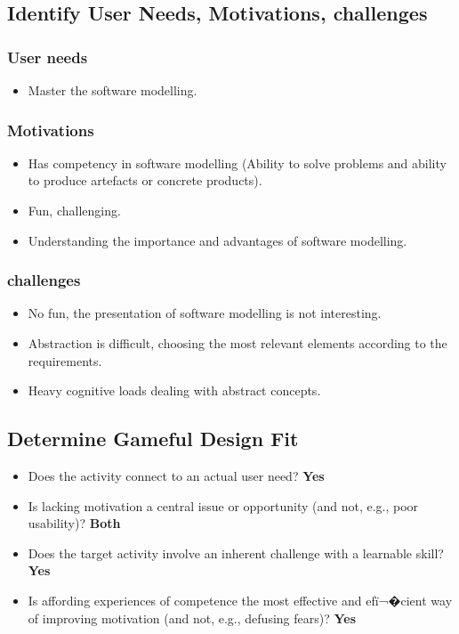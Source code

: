 \documentclass[12pt, a4paper]{report}
\begin{document}
\begin{appendices}
\subsection{Identify User Needs, Motivations, challenges}
\subsubsection{User needs}
\begin{itemize}
\item Master the software modelling.
\end{itemize}
\subsubsection{Motivations}
\begin{itemize}
\item Has competency in software modelling (Ability to solve problems and ability to produce artefacts or concrete products).
\item Fun, challenging.
\item Understanding the importance and advantages of software modelling.
\end{itemize}
\subsubsection{challenges}
\begin{itemize}
\item No fun, the presentation of software modelling is not interesting.
\item Abstraction is difficult, choosing the most relevant elements according to the requirements.
\item Heavy cognitive loads dealing with abstract concepts.
\end{itemize}

\subsection{Determine Gameful Design Fit}
\begin{itemize}
\item Does the activity connect to an actual user need? \textbf{Yes}
\item Is lacking motivation a central issue or opportunity (and not, e.g., poor usability)? \textbf{Both}
\item Does the target activity involve an inherent challenge with a learnable skill? \textbf{Yes}
\item Is affording experiences of competence the most effective and efï¬�cient way of improving motivation (and not, e.g., defusing fears)? \textbf{Yes}
\end{itemize}


\end{appendices}
\end{document}
